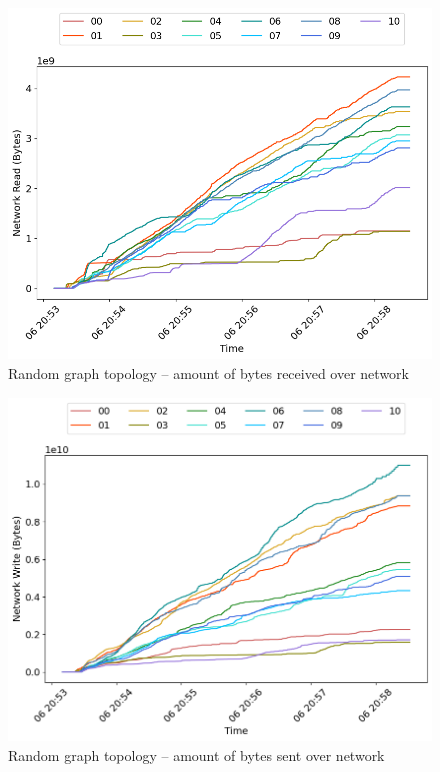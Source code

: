 \begin{minipage}{0.5\linewidth}
\begin{figure}[H]
\captionsetup{justification=centering,width=0.8\linewidth}
\includegraphics[width=\linewidth]{figures/graph-random/net_read.png}
\caption{Random graph topology -- amount of bytes received over network}
\label{fig:graph-random-cpu_usage}
\end{figure}
\end{minipage}
\begin{minipage}{0.5\linewidth}
\begin{figure}[H]
\captionsetup{justification=centering,width=0.8\linewidth}
\includegraphics[width=\linewidth]{figures/graph-random/net_write.png}
\caption{Random graph topology -- amount of bytes sent over network}
\label{fig:graph-random-mem_usage}
\end{figure}
\end{minipage}

